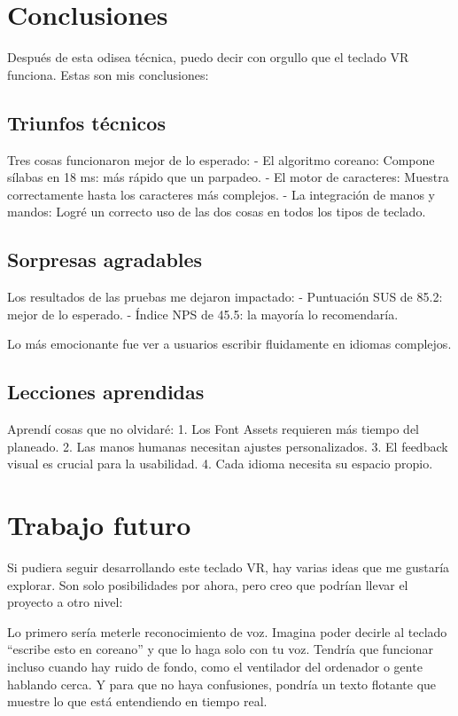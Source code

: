 \section{Conclusiones}

Después de esta odisea técnica, puedo decir con orgullo que el teclado VR funciona. Estas son mis conclusiones:

\subsection{Triunfos técnicos}
Tres cosas funcionaron mejor de lo esperado:
- El algoritmo coreano: Compone sílabas en 18 ms: más rápido que un parpadeo.
- El motor de caracteres: Muestra correctamente hasta los caracteres más complejos.
- La integración de manos y mandos: Logré un correcto uso de las dos cosas en todos los tipos de teclado.

\subsection{Sorpresas agradables}
Los resultados de las pruebas me dejaron impactado:
- Puntuación SUS de 85.2: mejor de lo esperado.
- Índice NPS de 45.5: la mayoría lo recomendaría.

Lo más emocionante fue ver a usuarios escribir fluidamente en idiomas complejos.

\subsection{Lecciones aprendidas}
Aprendí cosas que no olvidaré:
1. Los Font Assets requieren más tiempo del planeado.
2. Las manos humanas necesitan ajustes personalizados.
3. El feedback visual es crucial para la usabilidad.
4. Cada idioma necesita su espacio propio.


\section{Trabajo futuro}

Si pudiera seguir desarrollando este teclado VR, hay varias ideas que me gustaría explorar. Son solo posibilidades por ahora, pero creo que podrían llevar el proyecto a otro nivel:

Lo primero sería meterle reconocimiento de voz. Imagina poder decirle al teclado ``escribe esto en coreano'' y que lo haga solo con tu voz. Tendría que funcionar incluso cuando hay ruido de fondo, como el ventilador del ordenador o gente hablando cerca. Y para que no haya confusiones, pondría un texto flotante que muestre lo que está entendiendo en tiempo real.

